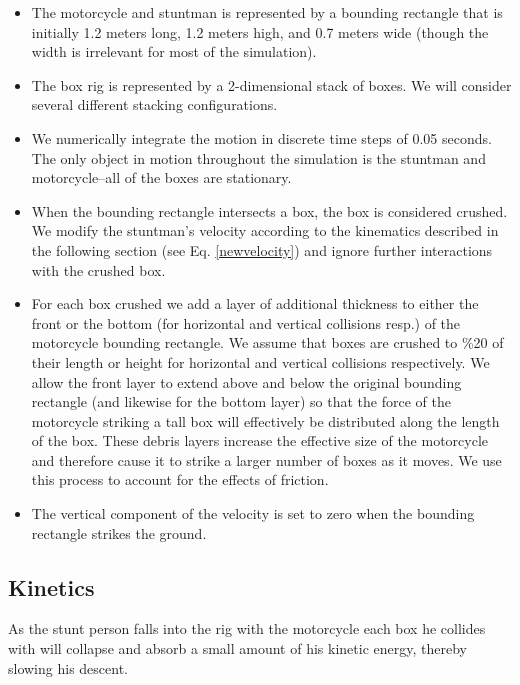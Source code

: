 \documentclass[12pt,a4paper,titlepage]{article}
\begin{document}
\begin{itemize}

\item The motorcycle and stuntman is represented by a bounding rectangle that is initially 1.2 meters long,
1.2 meters high, and 0.7 meters wide (though the width is irrelevant for most of the simulation).

\item The box rig is represented by a 2-dimensional stack of boxes.  We will consider several different
 stacking configurations.

\item We numerically integrate the motion in discrete time steps of 0.05 seconds.   The only object in motion
throughout the simulation is the stuntman and motorcycle--all of the boxes are stationary.

\item When the bounding rectangle intersects a box, the box is considered crushed.  We modify the stuntman's
velocity according to the kinematics described in the following section (see Eq. \ref{newvelocity}) and
ignore further interactions with the crushed box.

\item For each box crushed we add a layer of additional thickness to either the front or the bottom
(for horizontal and vertical collisions resp.) of the motorcycle bounding rectangle.  We assume
that boxes are crushed to \%20 of their length or height for horizontal and vertical collisions respectively.
We allow the front layer to extend above and below the original bounding rectangle (and likewise for the bottom layer)
so that the force of the motorcycle striking a tall box will effectively be distributed along the length of the box.
These debris layers increase the effective size of the motorcycle and therefore cause it to strike a larger
number of boxes as it moves.  We use this process to account for the effects of friction.

\item The vertical component of the velocity is set to zero when the bounding rectangle strikes the ground.

\end{itemize}

\subsection{Kinetics}

As the stunt person falls into the rig with the motorcycle each box he collides with will collapse and absorb
a small amount of his kinetic energy, thereby slowing his descent.
\end{document}

